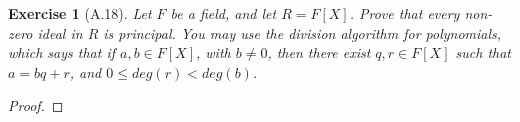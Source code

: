 \documentclass[10pt]{article}
\newtheorem{exercise}{Exercise}
\begin{document}
\begin{exercise}[A.18]
Let $F$ be a field, and let $R = F[X]$. Prove that every non-zero ideal in $R$ is principal. You may use the division algorithm for polynomials, which says that if $a, b \in F[X]$, with $b \neq  0$, then there exist $q, r \in F[X]$ such that $a = bq+r$, and $0 \leq deg(r) < deg(b)$.
\end{exercise}

\begin{proof}

\end{proof}
\end{document}
